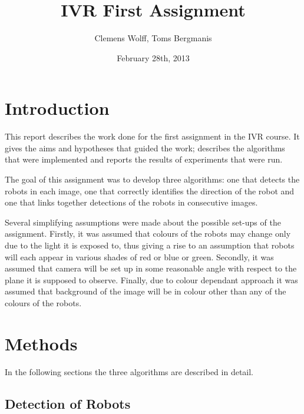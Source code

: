 \documentclass[10pt,a4paper,twocolumn]{article}
\title{IVR First Assignment}
\author{Clemens Wolff, Toms Bergmanis}
\date{February 28th, 2013}
\begin{document}
\maketitle
\section{Introduction}
This report describes the work done for the first assignment in the IVR course. It gives the
aims and hypotheses that guided the work; describes the algorithms that were implemented
and reports the results of experiments that were run.

The goal of this assignment was to develop three algorithms: one that detects the robots in each image, one that correctly identifies the direction of the robot and one that links together detections of the robots in consecutive images. 

Several simplifying assumptions were made about the possible set-ups of the assignment.  Firstly, it was assumed that colours of the robots may change only due to the light it is exposed to, thus giving a rise to an assumption that robots will each appear in various shades of red or blue or green. Secondly, it was assumed that camera will be set up in some reasonable angle with respect to the plane it is supposed to observe. Finally, due to colour dependant approach it was assumed that background of the image will be in colour other than any of the colours of the robots.

\section{Methods}
In the following sections the three algorithms are described in detail. 

\subsection{Detection of Robots}
\end{document}

